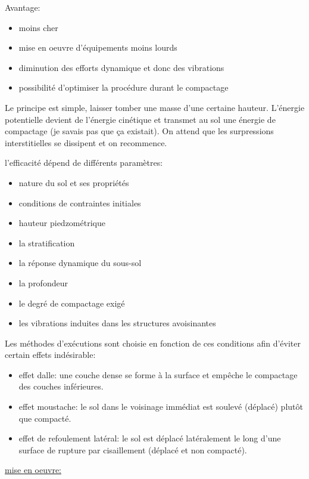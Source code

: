 \medskip 

Avantage:
\begin{itemize}
    \item moins cher
    \item mise en oeuvre d'équipements moins lourds
    \item diminution des efforts dynamique et donc des vibrations
    \item possibilité d'optimiser la procédure durant le compactage
\end{itemize} 
\medskip

Le principe est simple, laisser tomber une masse d'une certaine hauteur. L'énergie potentielle devient de l'énergie cinétique et transmet au sol une énergie de compactage (je savais pas que ça existait). On attend que les surpressions interstitielles se dissipent et on recommence. 

l'efficacité dépend de différents paramètres:
\begin{itemize}
    \item nature du sol et ses propriétés
    \item conditions de contraintes initiales
    \item hauteur piedzométrique
    \item la stratification
    \item la réponse dynamique du sous-sol
    \item la profondeur
    \item le degré de compactage exigé
    \item les vibrations induites dans les structures avoisinantes
\end{itemize}

\medskip

Les méthodes d'exécutions sont choisie en fonction de ces conditions afin d'éviter certain effets indésirable:
\begin{itemize}
    \item effet dalle: une couche dense se forme à la surface et empêche le compactage des couches inférieures.
    \item effet moustache: le sol dans le voisinage immédiat est soulevé (déplacé) plutôt que compacté.
    \item effet de refoulement latéral: le sol est déplacé latéralement le long d'une surface de rupture par cisaillement (déplacé et non compacté).
\end{itemize}

\medskip

\underline{mise en oeuvre:}

